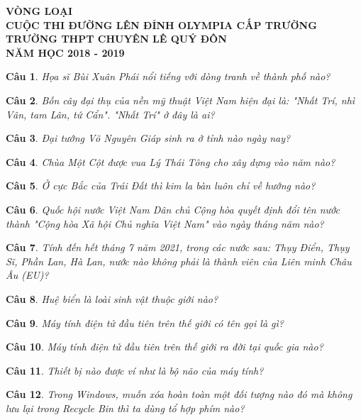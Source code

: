 \documentclass[12pt,a4paper]{article}
\author{Nguyễn Văn Lộc - 20120131}
\newtheorem{ques}{Câu}
\theoremstyle{nonumberplain}
\begin{document}
\begin{center}
\textbf{VÒNG LOẠI\\}
\textbf{CUỘC THI ĐƯỜNG LÊN ĐỈNH OLYMPIA CẤP TRƯỜNG\\}
\textbf{TRƯỜNG THPT CHUYÊN LÊ QUÝ ĐÔN\\}
\textbf{NĂM HỌC 2018 - 2019}
\end{center}
\begin{ques}
Họa sĩ Bùi Xuân Phái nổi tiếng với dòng tranh về thành phố nào?
\end{ques}
\begin{ques}
Bốn cây đại thụ của nền mỹ thuật Việt Nam hiện đại là: \textit{"Nhất Trí, nhì Vân, tam Lân, tứ Cẩn"}. "Nhất Trí" ở đây là ai?
\end{ques}
\begin{ques}
Đại tướng Võ Nguyên Giáp sinh ra ở tỉnh nào ngày nay?
\end{ques}
\begin{ques}
Chùa Một Cột được vua Lý Thái Tông cho xây dựng vào năm nào?
\end{ques}
\begin{ques}
Ở cực Bắc của Trái Đất thì kim la bàn luôn chỉ về hướng nào?
\end{ques}
\begin{ques}
Quốc hội nước Việt Nam Dân chủ Cộng hòa quyết định đổi tên nước thành \textit{"Cộng hòa Xã hội Chủ nghĩa Việt Nam"} vào ngày tháng năm nào?
\end{ques}
\begin{ques}
Tính đến hết tháng 7 năm 2021, trong các nước sau: Thụy Điển, Thụy Sĩ, Phần Lan, Hà Lan, nước nào không phải là thành viên của Liên minh Châu Âu (EU)?
\end{ques}
\begin{ques}
Huệ biển là loài sinh vật thuộc giới nào?
\end{ques}
\begin{ques}
Máy tính điện tử đầu tiên trên thế giới có tên gọi là gì?
\end{ques}
\begin{ques}
Máy tính điện tử đầu tiên trên thế giới ra đời tại quốc gia nào?
\end{ques}
\begin{ques}
Thiết bị nào được ví như là bộ não của máy tính?
\end{ques}
\begin{ques}
Trong Windows, muốn xóa hoàn toàn một đối tượng nào đó mà không lưu lại trong Recycle Bin thì ta dùng tổ hợp phím nào?
\end{ques}
\end{document}
